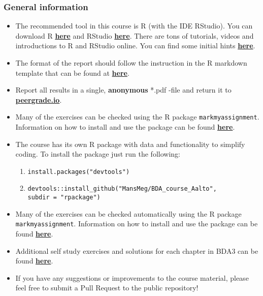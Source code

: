 
\subsubsection*{General information}

\begin{itemize}
\itemsep0em 
\item The recommended tool in this course is R (with the IDE RStudio). You can download R \href{https://cran.r-project.org/}{\textbf{here}} and RStudio \href{https://www.rstudio.com/products/rstudio/download/}{\textbf{here}}. There are tons of tutorials, videos and introductions to R and RStudio online. You can find some initial hints \href{https://www.rstudio.com/online-learning/}{\textbf{here}}. 
\item  The format of the report should follow the instruction in the R markdown template that can be found at \href{https://raw.githubusercontent.com/MansMeg/BDA_course_Aalto/master/templates/assignment_template.rmd}{\textbf{here}}. 
\item  Report all results in a single, {\bf anonymous} *.pdf -file and return it to \href{peergrade.io}{\textbf{peergrade.io}}. 
\item Many of the exercises can be checked using the R package \texttt{markmyassignment}. Information on how to install and use the package can be found \href{https://cran.r-project.org/web/packages/markmyassignment/vignettes/markmyassignment.html}{\textbf{here}}.
\item The course has its own R package with data and functionality to simplify coding. To install the package just run the following:
\begin{enumerate}
\item \texttt{install.packages("devtools")}
\item \texttt{devtools::install\_github("MansMeg/BDA\_course\_Aalto", \\ subdir = "rpackage")}
\end{enumerate}
\item Many of the exercises can be checked automatically using the R package \\ \texttt{markmyassignment}. Information on how to install and use the package can be found \href{https://cran.r-project.org/web/packages/markmyassignment/vignettes/markmyassignment.html}{\textbf{here}}.
\item Additional self study exercises and solutions for each chapter in BDA3 can be found \href{http://www.stat.columbia.edu/~gelman/book/solutions3.pdf}{\textbf{here}}.
\item If you have any suggestions or improvements to the course material, please feel free to submit a Pull Request to the public repository!
\end{itemize}